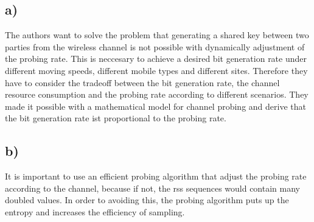 \documentclass[12pt,a4paper]{article}
\begin{document}
\subsection*{a)}
The authors want to solve the problem that generating a shared key between two parties from the wireless channel is not possible with dynamically adjustment of the probing rate. This is neccesary to achieve a desired bit generation rate under different moving speeds, different mobile types and different sites. Therefore they have to consider the tradeoff between the bit generation rate, the channel resource consumption and the probing rate according to different scenarios. They made it possible with a mathematical model for channel probing and derive that the bit generation rate ist proportional to the probing rate.
\subsection*{b)}
It is important to use an efficient probing algorithm that adjust the probing rate according to the channel, because if not, the rss sequences would contain many doubled values. In order to avoiding this, the probing algorithm puts up the entropy and increases the efficiency of sampling.
\end{document}
